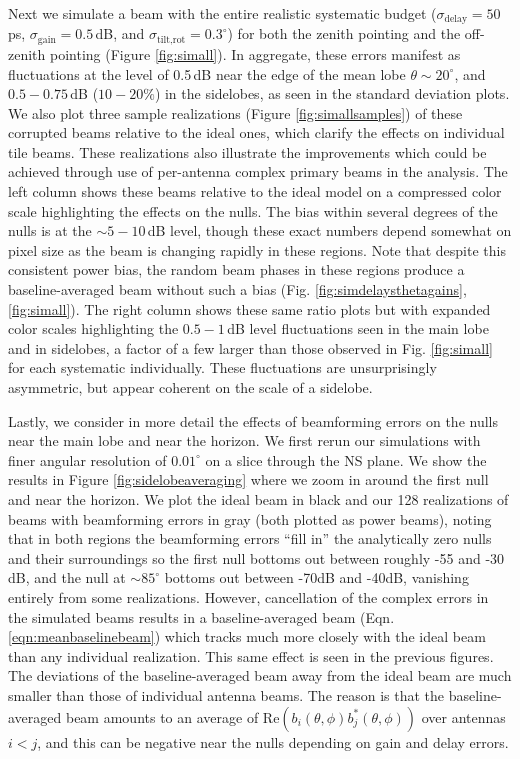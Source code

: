 Next we simulate a beam with the entire realistic systematic budget ($\sigma_\text{delay}=50$\,ps, $\sigma_\text{gain}=0.5$\,dB, and $\sigma_\text{tilt,rot}=0.3^\circ$) for both the zenith pointing and the off-zenith pointing  (Figure \ref{fig:simall}). In aggregate, these errors manifest as fluctuations at the level of 0.5\,dB near the edge of the mean lobe $\theta\sim20^\circ$, and $0.5-0.75$\,dB ($10-20\%$) in the sidelobes, as seen in the standard deviation plots. We also plot three sample realizations (Figure \ref{fig:simallsamples}) of these corrupted beams relative to the ideal ones, which clarify the effects on individual tile beams. These realizations also illustrate the improvements which could be achieved through use of per-antenna complex primary beams in the analysis. The left column shows these beams relative to the ideal model on a compressed color scale highlighting the effects on the nulls. The bias within several degrees of the nulls is at the $\sim5-10$\,dB level, though these exact numbers depend somewhat on pixel size as the beam is changing rapidly in these regions. Note that despite this consistent power bias, the random beam phases in these regions produce a baseline-averaged beam without such a bias (Fig. \ref{fig:simdelaysthetagains}, \ref{fig:simall}). The right column shows these same ratio plots but with expanded color scales highlighting the $0.5-1$\,dB level fluctuations seen in the main lobe and in sidelobes, a factor of a few larger than those observed in Fig. \ref{fig:simall} for each systematic individually. These fluctuations are unsurprisingly asymmetric, but appear coherent on the scale of a sidelobe. 

Lastly, we consider in more detail the effects of beamforming errors on the nulls near the main lobe and near the horizon. We first rerun our simulations with finer angular resolution of $0.01^\circ$ on a slice through the NS plane. We show the results in Figure \ref{fig:sidelobeaveraging} where we zoom in around the first null and near the horizon. We plot the ideal beam in black and our 128 realizations of beams with beamforming errors in gray (both plotted as power beams), noting that in both regions the beamforming errors ``fill in'' the analytically zero nulls and their surroundings so the first null bottoms out between roughly -55 and -30 dB, and the null at $\sim85^\circ$ bottoms out between -70dB and -40dB, vanishing entirely from some realizations. However, cancellation of the complex errors in the simulated beams results in a baseline-averaged beam (Eqn.\ref{eqn:meanbaselinebeam}) which tracks much more closely with the ideal beam than any individual realization. This same effect is seen in the previous figures. The deviations of the baseline-averaged beam away from the ideal beam are much smaller than those of individual antenna beams. The reason is that the baseline-averaged beam amounts to an average of $\text{Re}( b_i(\theta,\phi)b_j^*(\theta,\phi))$ over antennas $i<j$, and this can be negative near the nulls depending on gain and delay errors.

